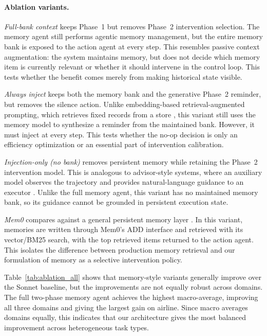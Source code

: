 \paragraph{Ablation variants.}
\textit{Full-bank context} keeps Phase~1 but removes Phase~2 intervention
selection. The memory agent still performs agentic memory management, but the
entire memory bank is exposed to the action agent at every step. This resembles
passive context augmentation: the system maintains memory, but does not decide
which memory item is currently relevant or whether it should intervene in the
control loop. This tests whether the benefit comes merely from making historical
state visible.

\textit{Always inject} keeps both the memory bank and the generative Phase~2
reminder, but removes the silence action. Unlike embedding-based
retrieval-augmented prompting, which retrieves fixed records from a store
\citep{lewis2020rag}, this variant still uses the memory model to synthesize a
reminder from the maintained bank. However, it must inject at every step. This
tests whether the no-op decision is only an efficiency optimization or an
essential part of intervention calibration.

\textit{Injection-only (no bank)} removes persistent memory while retaining the
Phase~2 intervention model. This is analogous to advisor-style systems, where an
auxiliary model observes the trajectory and provides natural-language guidance
to an executor \citep{asawa2025advisor,anthropic2026advisor}. Unlike the full
memory agent, this variant has no maintained memory bank, so its guidance cannot
be grounded in persistent execution state.

\textit{Mem0} compares against a general persistent memory layer
\citep{mem0ai2026mem0}. In this variant, memories are written through Mem0's
ADD interface and retrieved with its vector/BM25 search, with the top retrieved
items returned to the action agent. This isolates the difference between
production memory retrieval and our formulation of memory as a selective
intervention policy.


Table~\ref{tab:ablation_all} shows that memory-style variants generally improve
over the Sonnet baseline, but the improvements are not equally robust across
domains. The full two-phase memory agent achieves the highest macro-average,
improving all three domains and giving the largest gain on airline. Since macro
averages domains equally, this indicates that our architecture gives the most
balanced improvement across heterogeneous task types.

